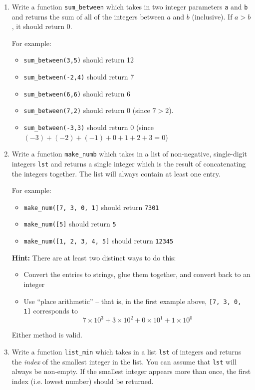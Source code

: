 \documentclass{article}
\begin{document}
\begin{enumerate}
\item  Write a function \verb|sum_between| which takes in two integer parameters \verb|a| and \verb|b| and returns the sum of all of the integers between $a$ and $b$ (inclusive). If $a > b$, it should return $0$.

For example:

\begin{itemize}
  \item  \verb|sum_between(3,5)| should return 12
  \item  \verb|sum_between(-2,4)| should return 7
  \item  \verb|sum_between(6,6)| should return 6
  \item  \verb|sum_between(7,2)| should return 0 (since $7 > 2$).
    \item  \verb|sum_between(-3,3)| should return 0 (since $(-3) + (-2) + (-1) + 0 + 1 + 2 + 3 =0$)
\end{itemize}

\item Write a function \verb|make_numb| which takes in a list of non-negative, single-digit integers \verb|lst| and returns a single integer which is the result of concatenating the integers together. The list will always contain at least one entry.

    For example:

\begin{itemize}
  \item  \verb|make_num([7, 3, 0, 1]| should return \verb|7301|
  \item  \verb|make_num([5]| should return \verb|5|
  \item  \verb|make_num([1, 2, 3, 4, 5]| should return \verb|12345|
\end{itemize}

\textbf{Hint:} There are at least two distinct ways to do this:
\begin{itemize}
  \item Convert the entries to strings, glue them together, and convert back to an integer
  \item Use ``place arithmetic'' -- that is, in the first example above, \verb|[7, 3, 0, 1]| corresponds to $$ 7 \times 10^3 + 3 \times 10^2 + 0 \times 10^1 + 1 \times 10^0$$
\end{itemize}
Either method is valid.


\item  Write a function \verb|list_min| which takes in a list \verb|lst| of integers and returns the \emph{index} of the smallest integer in the list. You can assume that \verb|lst| will always be non-empty. If the smallest integer appears more than once, the first index (i.e. lowest number) should be returned.


\end{enumerate}
\end{document}

